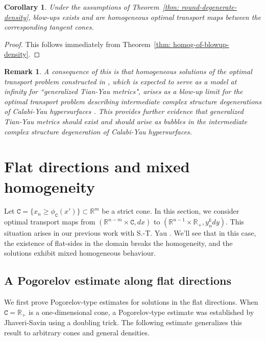 \documentclass[12pt,reqno]{amsart}
\newtheorem{corr}{Corollary}[section]
\newtheorem{remark}{Remark}[section]
\numberwithin{equation}{section}
\begin{document}
\begin{corr}
    Under the assumptions of Theorem~\ref{thm: round-degenerate-density}, blow-ups exists and are homogeneous optimal transport maps between the corresponding tangent cones. 
\end{corr}

\begin{proof}
This follows immediately from Theorem~\ref{thm: homog-of-blowup-density}.
\end{proof}

\begin{remark}
    A consequence of this is that homogeneous solutions of the optimal transport problem constructed in \cite{Collins-Tong-Yau}, which is expected to serve as a model at infinity for ``generalized Tian-Yau metrics", arises as a blow-up limit for the optimal transport problem describing intermediate complex structure degenerations of Calabi-Yau hypersurfaces \cite{Li-intermediate}. This provides further evidence that generalized Tian-Yau metrics should exist and should arise as bubbles in the intermediate complex structure degeneration of Calabi-Yau hypersurfaces. 
\end{remark}



\section{Flat directions and mixed homogeneity}\label{sec: flat-side}
Let $\mathtt C = \{x_n\geq \phi_{\mathtt C}(x')\}\subset \mathbb R^m$ be a strict cone. In this section, we consider optimal transport maps from $(\mathbb R^{n-m}\times \mathtt C, dx)$ to $(\mathbb R^{n-1}\times \mathbb R_+, y_n^kdy)$. This situation arises in our previous work with S.-T. Yau \cite{Collins-Tong-Yau}. We'll see that in this case, the existence of flat-sides in the domain breaks the homogeneity, and the solutions exhibit mixed homogeneous behaviour. 

\subsection{A Pogorelov estimate along flat directions} We first prove Pogorelov-type estimates for solutions in the flat directions.  When $\mathtt{C}= \mathbb{R}_+$ is a one-dimensional cone, a Pogorelov-type estimate was established by Jhaveri-Savin \cite[Proposition 4.1]{Jhaveri-Savin} using a doubling trick.  The following estimate generalizes this result to arbitrary cones and general densities.
\end{document}
